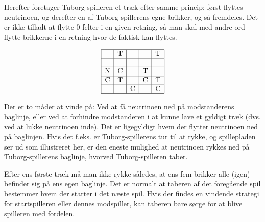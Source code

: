 \bigskip
Herefter foretager Tuborg-spilleren et træk efter samme princip; først flyttes neutrinoen, og derefter en af Tuborg-spillerens egne brikker, og så fremdeles. Det er ikke tilladt at flytte 0 felter i en given retning, så man skal med andre ord flytte brikkerne i en retning hvor de faktisk kan flyttes. 

\begin{figure}
	\[
	\begin{array}{|c|c|c|c|c|}
		\hline
		& \text{T} &  &  & \text{T} \\ 
		\hline
		&    &     &  &     \\ 
		\hline
		\text{N} & \text{C}  &  &  \text{T}	  &      \\ 
		\hline
		\text{C} & \text{T}   &    &  \text{C}   &  \text{T}   \\ 
		\hline
		&  & \text{C} &  & \text{C} \\ 
		\hline
	\end{array}
	\]
\end{figure}
Der er to måder at vinde på: Ved at få neutrinoen ned på modstanderens baglinje, eller ved at forhindre modstanderen i at kunne lave et gyldigt træk (dvs. ved at lukke neutrinoen inde). Det er ligegyldigt hvem der flytter neutrinoen ned på baglinjen. Hvis det f.eks. er Tuborg-spillerens tur til at rykke, og spillepladen ser ud som illustreret her, er den eneste mulighed at neutrinoen rykkes ned på Tuborg-spillerens baglinje, hvorved Tuborg-spilleren taber.

Efter ens første træk må man ikke rykke således, at ens fem brikker alle (igen) befinder sig på ens egen baglinje. Det er normalt at taberen af det foregående spil bestemmer hvem der starter i det næste spil. Hvis der findes en vindende strategi for startspilleren eller dennes modspiller, kan taberen bare sørge for at blive spilleren med fordelen.

\newpage